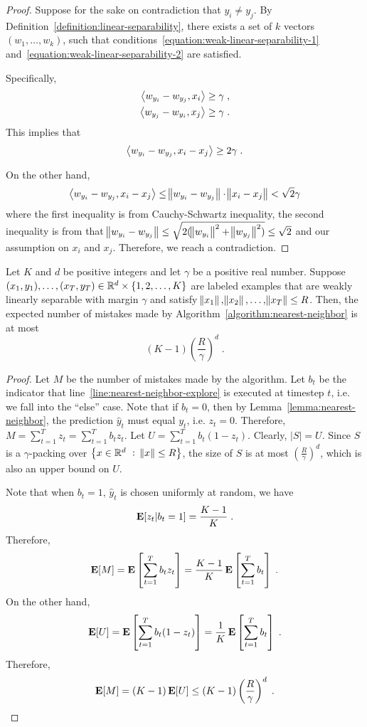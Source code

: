 \begin{proof}
Suppose for the sake on contradiction that $y_i \neq y_j$. By
Definition~\ref{definition:linear-separability}, there exists a set of $k$
vectors $(w_1, \ldots, w_k)$, such that
conditions~\eqref{equation:weak-linear-separability-1}
and~\eqref{equation:weak-linear-separability-2} are satisfied.

Specifically,
\begin{align*}
\left\langle w_{y_i} - w_{y_j}, x_i \right\rangle & \ge \gamma \; , \\
\left\langle w_{y_j} - w_{y_i}, x_j \right\rangle & \ge \gamma \; .
\end{align*}
This implies that
$$
\left\langle w_{y_i} - w_{y_j}, x_i - x_j \right\rangle \ge 2\gamma \; .
$$

On the other hand,
$$
\left\langle w_{y_i} - w_{y_j}, x_i - x_j \right\rangle \le \norm{w_{y_i} - w_{y_j}} \cdot \norm{x_i - x_j} < \sqrt{2} \gamma
$$
where the first inequality is from Cauchy-Schwartz inequality, the second
inequality is from that $\norm{w_{y_i} - w_{y_j}} \le \sqrt{2(\norm{w_{y_i}}^2 +
\norm{w_{y_j}}^2)} \leq \sqrt{2}$ and our assumption on $x_i$ and $x_j$.
Therefore, we reach a contradiction.
\end{proof}

\begin{theorem}
\label{theorem:margin_at_upper}
Let $K$ and $d$ be positive integers and let $\gamma$ be a positive real number.
Suppose $(x_1,y_1), \ldots, (x_T, y_T) \in \mathbb{R}^d \times \{1,2,\dots,K\}$ are
labeled examples that are weakly linearly separable with margin $\gamma$ and
satisfy $\norm{x_1}, \norm{x_2}, \dots, \norm{x_T} \le R$. Then, the expected
number of mistakes made by Algorithm~\ref{algorithm:nearest-neighbor} is at most
$$
(K-1) \left( \frac{R}{\gamma} \right)^d \; .
$$
\end{theorem}

\begin{proof}
Let $M$ be the number of mistakes made by the algorithm. Let $b_t$ be the
indicator that line~\ref{line:nearest-neighbor-explore} is executed at timestep
$t$, i.e. we fall into the ``else'' case. Note that if $b_t = 0$, then by
Lemma~\ref{lemma:nearest-neighbor}, the prediction $\widehat{y}_t$ must equal
$y_t$, i.e. $z_t = 0$. Therefore, $M = \sum_{t=1}^T z_t = \sum_{t=1}^T b_t z_t$.
Let $U = \sum_{t=1}^T b_t (1-z_t)$. Clearly, $|S| = U$. Since $S$ is a
$\gamma$-packing over $\cbr{x \in \R^d ~:~ \norm{x} \le R}$, the size of $S$ is
at most $(\frac R \gamma)^d$, which is also an upper bound on $U$.

Note that when $b_t = 1$, $\widehat{y}_t$ is chosen uniformly at random, we have
$$
\operatorname*{\mathbf{E}}[ z_t | b_t = 1] = \frac{K-1}{K} \; .
$$
Therefore,
$$
\operatorname*{\mathbf{E}}[M] = \operatorname*{\mathbf{E}} \left[ \sum_{t=1}^T b_t z_t \right] = \frac{K-1}{K} \operatorname*{\mathbf{E}} \left[ \sum_{t=1}^T b_t \right] \; .
$$
On the other hand,
$$
\operatorname*{\mathbf{E}}[U] = \operatorname*{\mathbf{E}} \left[ \sum_{t=1}^T b_t (1-z_t) \right] = \frac 1 K \operatorname*{\mathbf{E}} \left[\sum_{t=1}^T b_t \right] \; .
$$
Therefore,
$$
\operatorname*{\mathbf{E}}[M] = (K-1) \operatorname*{\mathbf{E}}[U] \leq (K-1) \left(\frac{R}{\gamma} \right)^d \; .
$$
\end{proof}

